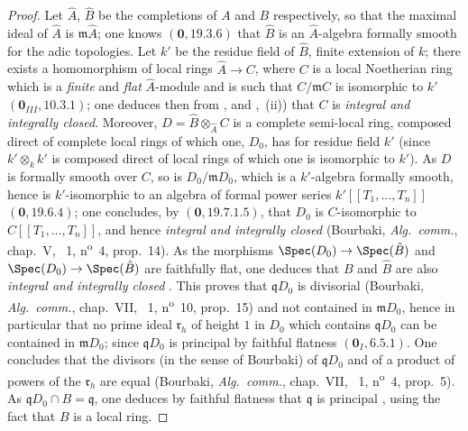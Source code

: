 \begin{proof}
Let $\hat{A}$, $\hat{B}$ be the completions of $A$ and $B$ respectively, so that the maximal ideal of $\hat{A}$ is $\mathfrak{m}\hat{A}$; one knows $(\mathbf{0}, 19.3.6)$ that $\hat{B}$ is an $\hat{A}$-algebra formally smooth for the adic topologies.
Let $k'$ be the residue field of $\hat{B}$, finite extension of $k$; there exists a homomorphism of local rings $\hat{A}\to C$, where $C$ is a local Noetherian ring which is a \emph{finite} and \emph{flat} $\hat{A}$-module and is such that $C/\mathfrak{m}C$ is isomorphic to $k'$ $(\mathbf{0}_{III}, 10.3.1)$; one deduces then from ,  and ,~(ii)) that $C$ is \emph{integral and integrally closed}.
Moreover, $D=\hat{B}\otimes_{\hat{A}}C$ is a complete semi-local ring, composed direct of complete local rings of which one, $D_0$, has for residue field $k'$ (since $k'\otimes_k k'$ is composed direct of local rings of which one is isomorphic to $k'$).
As $D$ is formally smooth over $C$, so is $D_0/\mathfrak{m}D_0$, which is a $k'$-algebra formally smooth, hence is $k'$-isomorphic to an algebra of formal power series $k'[[T_1,\ldots,T_n]]$ $(\mathbf{0}, 19.6.4)$; one concludes, by $(\mathbf{0}, 19.7.1.5)$, that $D_0$ is $C$-isomorphic to $C[[T_1,\ldots,T_n]]$, and hence \emph{integral and integrally closed} (Bourbaki, \emph{Alg.\ comm.}, chap.~V, \textsection~1, n\textsuperscript{o}~4, prop.~14).
As the morphisms $\Spec(D_0)\to\Spec(\hat{B})$ and $\Spec(D_0)\to\Spec(\hat{B})$ are faithfully flat, one deduces that $B$ and $\hat{B}$ are also \emph{integral and integrally closed} .
This proves that $\mathfrak{q}D_0$ is divisorial (Bourbaki, \emph{Alg.\ comm.}, chap.~VII, \textsection~1, n\textsuperscript{o}~10, prop.~15) and not contained in $\mathfrak{m}D_0$, hence in particular that no prime ideal $\mathfrak{r}_h$ of height $1$ in $D_0$ which contains $\mathfrak{q}D_0$ can be contained in $\mathfrak{m}D_0$; since $\mathfrak{q}D_0$ is principal by faithful flatness $(\mathbf{0}_I, 6.5.1)$.
One concludes that the divisors (in the sense of Bourbaki) of $\mathfrak{q}D_0$ and of a product of powers of the $\mathfrak{r}_h$ are equal (Bourbaki, \emph{Alg.\ comm.}, chap.~VII, \textsection~1, n\textsuperscript{o}~4, prop.~5).
As $\mathfrak{q}D_0\cap B=\mathfrak{q}$, one deduces by faithful flatness that $\mathfrak{q}$ is principal , using the fact that $B$ is a local ring.


\end{proof}
